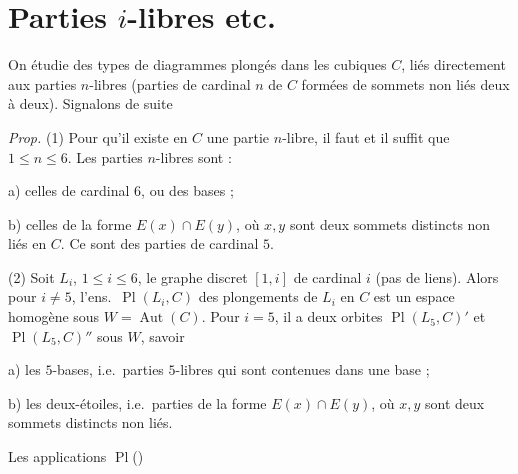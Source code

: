 \documentclass[11pt,a4paper]{article}
\begin{document}
\section{Parties $i$-libres etc.}


On étudie des types de diagrammes plongés dans les  cubiques $C$, liés directement aux parties $n$-libres  (parties de cardinal $n$ de $C$ formées de sommets non liés deux à deux). Signalons \struck{\ill{}} de suite

\emph{Prop.} (1) Pour qu'il existe en $C$ une partie $n$-libre, il faut et il suffit que $1\leq n\leq 6$. Les parties $n$-libres  \struck{\ill{}} sont :

a) celles de cardinal $6$, ou  des bases ;

b) celles  \ill{} de la forme $E(x)\cap E(y)$, où $x,y$ sont deux sommets distincts non liés en $C$. Ce sont des parties de cardinal $5$.

(2) Soit $L_i$, $1\leq i\leq 6$, le graphe discret $[1,i]$  de cardinal $i$ (pas de liens). Alors pour $i\neq 5$, l'ens.\ $\operatorname{Pl}(L_i,C)$ des plongements de $L_i$ en $C$ est un espace homogène sous $W=\operatorname{Aut}(C)$. Pour $i=5$, il a deux orbites $\operatorname{Pl}(L_5,C)'$ et $\operatorname{Pl}(L_5,C)''$ sous $W$, savoir

a) les $5$-bases, i.e.\ parties $5$-libres qui sont contenues dans une base \ill{} ;

b) les deux-étoiles, i.e.\ parties de la forme $E(x)\cap E(y)$, où $x,y$ sont deux sommets distincts non liés.

Les applications $\operatorname{Pl}$()

\end{document}
